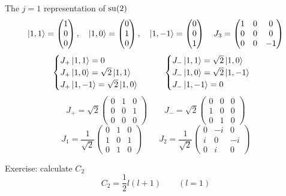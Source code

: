 \begin{example}
The $j=1$ representation of $\operatorname{su}(2)$
\[\left| 1,1 \right\rangle = \begin{pmatrix} 1\\0\\0 \end{pmatrix}, \quad \left| 1,0 \right\rangle = \begin{pmatrix} 0\\1\\0 \end{pmatrix}, \quad \left| 1,-1 \right\rangle = \begin{pmatrix} 0\\0\\1 \end{pmatrix} \quad J_3 = \begin{pmatrix}
1&0&0\\0&0&0\\0&0&-1
\end{pmatrix}\]
\[ \begin{cases}
J_+\left| 1,1 \right\rangle = 0 \\
J_+\left| 1,0 \right\rangle = \sqrt{2}\left| 1,1 \right\rangle \\
J_+\left| 1,-1 \right\rangle = \sqrt{2}\left| 1,0 \right\rangle
\end{cases} \qquad \begin{cases}
J_-\left| 1,1 \right\rangle = \sqrt{2}\left| 1,0 \right\rangle \\
J_-\left| 1,0 \right\rangle = \sqrt{2}\left| 1,-1 \right\rangle \\
J_-\left| 1,-1 \right\rangle = 0
\end{cases} \]
\[J_+ = \sqrt{2}\begin{pmatrix}
0&1&0\\0&0&1\\0&0&0
\end{pmatrix} \qquad J_- = \sqrt{2}\begin{pmatrix}
0&0&0\\1&0&0\\0&1&0
\end{pmatrix}\]
\[ J_1 = \frac{1}{\sqrt{2}}\begin{pmatrix}
0&1&0\\1&0&1\\0&1&0
\end{pmatrix} \qquad J_2 = \frac{1}{\sqrt{2}} \begin{pmatrix}
0&-i&0\\i&0&-i\\0&i&0
\end{pmatrix}\]
\end{example}

\begin{example}
Exercise: calculate $C_2$
\[ C_2 = \frac{1}{2}l(l+1) \qquad (l=1) \]
\end{example}